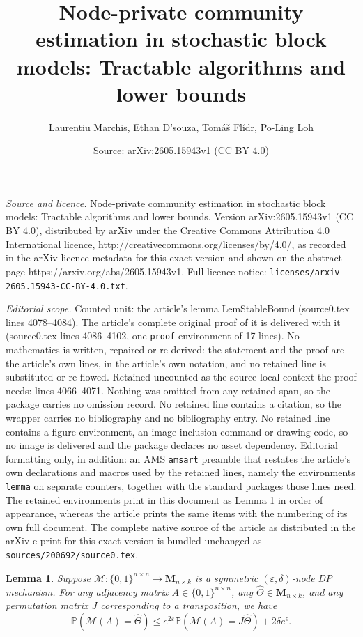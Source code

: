 \documentclass[10pt,a4paper]{amsart}
\title{Node-private community estimation in stochastic block models: Tractable algorithms and lower bounds}
\author{Laurentiu Marchis, Ethan D'souza, Tom\'a\v{s} Fl\'idr, Po-Ling Loh}
\date{Source: arXiv:2605.15943v1 (CC BY 4.0)}
\newtheorem{lemma}{Lemma}
\newcommand{\calM}{\mathcal{M}}
\newcommand{\eps}{\varepsilon}
\begin{document}
\maketitle

\noindent\emph{Source and licence.} Node-private community estimation in stochastic block models: Tractable algorithms and lower bounds. Version arXiv:2605.15943v1 (CC BY 4.0), distributed by arXiv under the Creative Commons Attribution 4.0 International licence, http://creativecommons.org/licenses/by/4.0/, as recorded in the arXiv licence metadata for this exact version and shown on the abstract page https://arxiv.org/abs/2605.15943v1. Full licence notice: \texttt{licenses/arxiv-2605.15943-CC-BY-4.0.txt}.\par\smallskip

\noindent\textit{Editorial scope.} Counted unit: the article's lemma LemStableBound (source0.tex lines 4078--4084). The article's complete original proof of it is delivered with it (source0.tex lines 4086--4102, one \texttt{proof} environment of 17 lines). No mathematics is written, repaired or re-derived: the statement and the proof are the article's own lines, in the article's own notation, and no retained line is substituted or re-flowed.  Retained uncounted as the source-local context the proof needs: lines 4066--4071.  Nothing was omitted from any retained span, so the package carries no omission record.  No retained line contains a citation, so the wrapper carries no bibliography and no bibliography entry.  No retained line contains a figure environment, an image-inclusion command or drawing code, so no image is delivered and the package declares no asset dependency.  Editorial formatting only, in addition: an AMS \texttt{amsart} preamble that restates the article's own declarations and macros used by the retained lines, namely the environments \texttt{lemma} on separate counters, together with the standard packages those lines need.  The retained environments print in this document as Lemma 1 in order of appearance, whereas the article prints the same items with the numbering of its own full document.  The complete native source of the article as distributed in the arXiv e-print for this exact version is bundled unchanged as \texttt{sources/200692/source0.tex}.
\begin{lemma}
\label{LemPerm}
Suppose $\calM: \{0,1\}^{n\times n}\to \mathbf{M}_{n\times k}$ is a symmetric $(\eps, \delta)$-node DP mechanism. For any adjacency matrix $A\in \{0,1\}^{n\times n}$, any $\hat\Theta\in \mathbf{M}_{n\times k}$, and any permutation matrix $J$ corresponding to a transposition, we have
$$\mathbb{P}(\calM(A) = \hat{\Theta}) \leq e^{2\eps} \mathbb{P}(\calM(A)=J\hat{\Theta}) + 2\delta e^{\epsilon}.
$$
\end{lemma}
\end{document}
